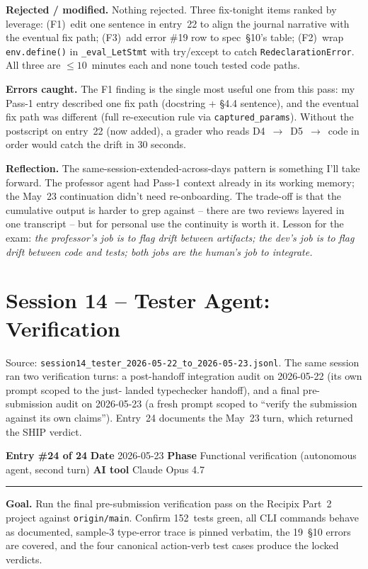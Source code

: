 \documentclass[11pt,a4paper]{article}
\newcommand{\entryheader}[4]{%
    \par\vspace{1em}\noindent\textbf{Entry \#{#1}} \textbullet{} \textbf{Date} #2 \textbullet{} \textbf{Phase} #3 \textbullet{} \textbf{AI tool} #4 \par\vspace{0.3em}\noindent\rule{\textwidth}{0.4pt}\par\vspace{0.3em}}
\newcommand{\field}[1]{\noindent\textbf{#1}}
\begin{document}
\field{Rejected / modified.} Nothing rejected. Three fix-tonight items
ranked by leverage: (F1)~edit one sentence in entry~22 to align the
journal narrative with the eventual fix path; (F3)~add error \#19 row
to spec~\S10's table; (F2)~wrap \texttt{env.define()} in
\texttt{\_eval\_LetStmt} with try/except to catch
\texttt{RedeclarationError}. All three are $\leq 10$~minutes each and
none touch tested code paths.

\field{Errors caught.} The F1 finding is the single most useful one
from this pass: my Pass-1 entry described one fix path (docstring +
\S4.4 sentence), and the eventual fix path was different (full
re-execution rule via \texttt{captured\_params}). Without the
postscript on entry~22 (now added), a grader who reads
D4~$\to$~D5~$\to$~code in order would catch the drift in 30 seconds.

\field{Reflection.} The same-session-extended-across-days pattern is
something I'll take forward. The professor agent had Pass-1 context
already in its working memory; the May~23 continuation didn't need
re-onboarding. The trade-off is that the cumulative output is harder
to grep against -- there are two reviews layered in one transcript --
but for personal use the continuity is worth it. Lesson for the
exam: \emph{the professor's job is to flag drift between artifacts;
the dev's job is to flag drift between code and tests; both jobs are
the human's job to integrate.}


\section{Session 14 -- Tester Agent: Verification}

Source: \texttt{session14\_tester\_2026-05-22\_to\_2026-05-23.jsonl}.
The same session ran two verification turns: a post-handoff
integration audit on 2026-05-22 (its own prompt scoped to the just-
landed typechecker handoff), and a final pre-submission audit on
2026-05-23 (a fresh prompt scoped to ``verify the submission
against its own claims''). Entry~24 documents the May~23 turn, which
returned the SHIP verdict.

\entryheader{24 of 24}{2026-05-23}{Functional verification (autonomous agent, second turn)}{Claude Opus 4.7}

\field{Goal.} Run the final pre-submission verification pass on the
Recipix Part~2 project against \texttt{origin/main}. Confirm 152~tests
green, all CLI commands behave as documented, sample-3 type-error
trace is pinned verbatim, the 19~\S10 errors are covered, and the
four canonical action-verb test cases produce the locked verdicts.
\end{document}
